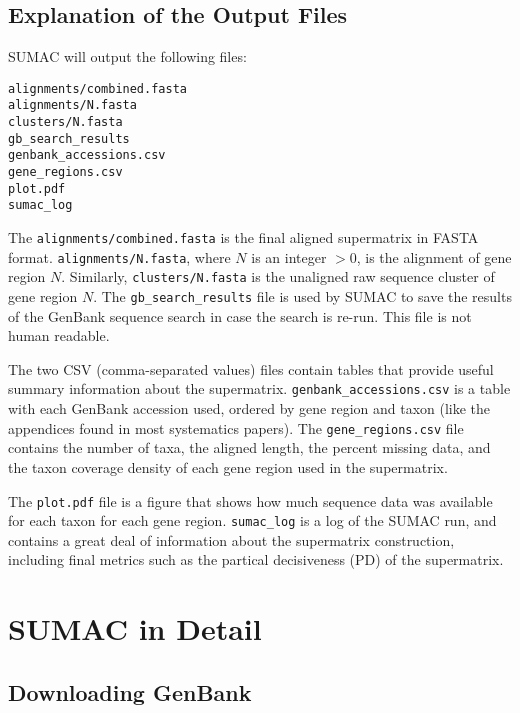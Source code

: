 \documentclass[12pt]{report}
\begin{document}
\section{Explanation of the Output Files}

SUMAC will output the following files:

\begin{verbatim}
alignments/combined.fasta
alignments/N.fasta
clusters/N.fasta
gb_search_results
genbank_accessions.csv
gene_regions.csv
plot.pdf
sumac_log
\end{verbatim}

The \verb|alignments/combined.fasta| is the final aligned supermatrix in FASTA format.
\verb|alignments/N.fasta|, where $N$ is an integer $> 0$, is the alignment of gene region $N$.
Similarly, \verb|clusters/N.fasta| is the unaligned raw sequence cluster of gene region $N$.
The \verb|gb_search_results| file is used by SUMAC to save the results of the GenBank
sequence search in case the search is re-run. This file is not human readable.

The two CSV (comma-separated values) files contain tables that provide useful
summary information about the supermatrix. \verb|genbank_accessions.csv| is a table
with each GenBank accession used, ordered by gene region and taxon (like the
appendices found in most systematics papers). The \verb|gene_regions.csv|
file contains the number of taxa, the aligned length, the percent missing data,
and the taxon coverage density of each gene region used in the supermatrix.

The \verb|plot.pdf| file is a figure that shows how much sequence data was available for
each taxon for each gene region.
\verb|sumac_log| is a log of the SUMAC run, and contains a great deal of information
about the supermatrix construction, including final metrics such as the partical
decisiveness (PD) of the supermatrix.




\chapter{SUMAC in Detail}

\section{Downloading GenBank}
\end{document}
